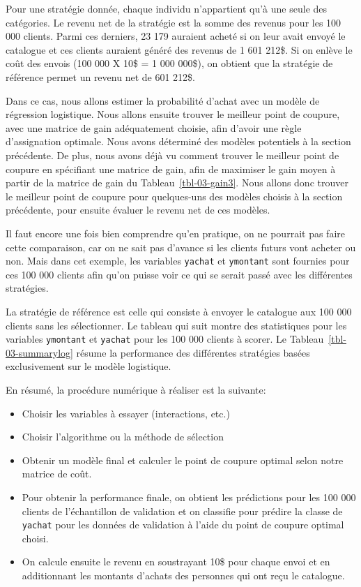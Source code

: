 \documentclass[
  11pt,
  letterpaper,
]{book}
\providecommand{\tightlist}{%
  \setlength{\itemsep}{0pt}\setlength{\parskip}{0pt}}\usepackage{longtable,booktabs,array}
\theoremstyle{definition}
\theoremstyle{remark}
\begin{document}
Pour une stratégie donnée, chaque individu n'appartient qu'à une seule
des catégories. Le revenu net de la stratégie est la somme des revenus
pour les 100 000 clients. Parmi ces derniers, 23 179 auraient acheté si
on leur avait envoyé le catalogue et ces clients auraient généré des
revenus de 1 601 212\$. Si on enlève le coût des envois (100 000 X 10\$
= 1 000 000\$), on obtient que la stratégie de référence permet un
revenu net de 601 212\$.

Dans ce cas, nous allons estimer la probabilité d'achat avec un modèle
de régression logistique. Nous allons ensuite trouver le meilleur point
de coupure, avec une matrice de gain adéquatement choisie, afin d'avoir
une règle d'assignation optimale. Nous avons déterminé des modèles
potentiels à la section précédente. De plus, nous avons déjà vu comment
trouver le meilleur point de coupure en spécifiant une matrice de gain,
afin de maximiser le gain moyen à partir de la matrice de gain du
Tableau~\ref{tbl-03-gain3}. Nous allons donc trouver le meilleur point
de coupure pour quelques-uns des modèles choisis à la section
précédente, pour ensuite évaluer le revenu net de ces modèles.

Il faut encore une fois bien comprendre qu'en pratique, on ne pourrait
pas faire cette comparaison, car on ne sait pas d'avance si les clients
futurs vont acheter ou non. Mais dans cet exemple, les variables
\texttt{yachat} et \texttt{ymontant} sont fournies pour ces 100 000
clients afin qu'on puisse voir ce qui se serait passé avec les
différentes stratégies.

La stratégie de référence est celle qui consiste à envoyer le catalogue
aux 100 000 clients sans les sélectionner. Le tableau qui suit montre
des statistiques pour les variables \texttt{ymontant} et \texttt{yachat}
pour les 100 000 clients à scorer. Le Tableau~\ref{tbl-03-summarylog}
résume la performance des différentes stratégies basées exclusivement
sur le modèle logistique.

En résumé, la procédure numérique à réaliser est la suivante:

\begin{itemize}
\tightlist
\item
  Choisir les variables à essayer (interactions, etc.)
\item
  Choisir l'algorithme ou la méthode de sélection
\item
  Obtenir un modèle final et calculer le point de coupure optimal selon
  notre matrice de coût.
\item
  Pour obtenir la performance finale, on obtient les prédictions pour
  les 100 000 clients de l'échantillon de validation et on classifie
  pour prédire la classe de \texttt{yachat} pour les données de
  validation à l'aide du point de coupure optimal choisi.
\item
  On calcule ensuite le revenu en soustrayant 10\$ pour chaque envoi et
  en additionnant les montants d'achats des personnes qui ont reçu le
  catalogue.
\end{itemize}
\end{document}
